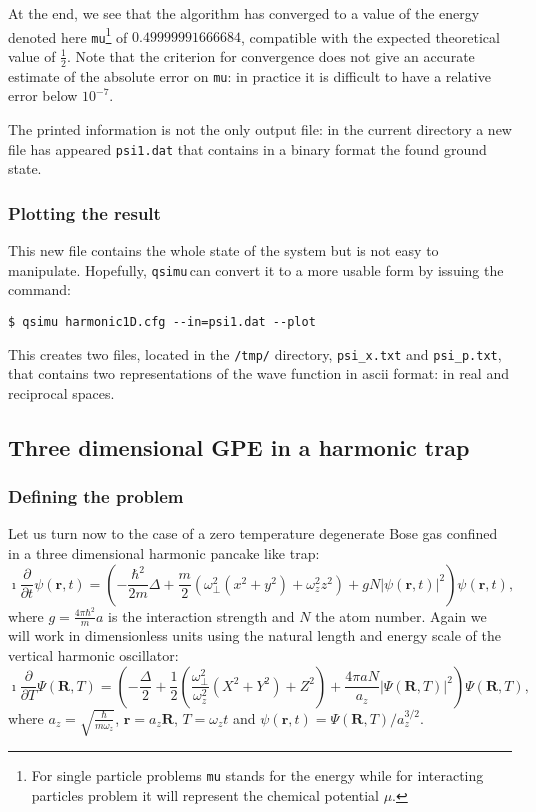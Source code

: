 \documentclass[12pt,a4paper]{report}
\newcommand{\abs}[1]{\left|#1\right|}
\newcommand{\qsimu}{\texttt{qsimu}\,}
\begin{document}
At the end, we see that the algorithm has converged to a value of the energy denoted here \texttt{mu}\footnote{For single particle problems \texttt{mu} stands for the energy while for interacting particles problem it will represent the chemical potential $\mu$.} of $0.49999991666684$, compatible with the expected theoretical value of $\frac{1}{2}$.
Note that the criterion for convergence does not give an accurate estimate of the absolute error on \texttt{mu}: in practice it is difficult to have a relative error below $10^{-7}$.

The printed information is not the only output file: in the current directory a new file has appeared \texttt{psi1.dat} that contains in a binary format the found ground state.

\subsubsection{Plotting the result}
This new file contains the whole state of the system but is not easy to manipulate.
Hopefully, \qsimu can convert it to a more usable form by issuing the command:
\begin{verbatim}
$ qsimu harmonic1D.cfg --in=psi1.dat --plot
\end{verbatim}
This creates two files, located in the \texttt{/tmp/} directory, \texttt{psi\_x.txt} and \texttt{psi\_p.txt}, that contains two representations of the wave function in ascii format: in real and reciprocal spaces.


\subsection{Three dimensional GPE in a harmonic trap}
\subsubsection{Defining the problem}
Let us turn now to the case of a zero temperature degenerate Bose gas confined in a three dimensional harmonic pancake like trap:
\begin{equation}
\imath\frac{\partial}{\partial t}\psi(\bm{r},t)=
\left(-\frac{\hbar^2}{2m}\Delta+\frac{m}{2}(\omega_\perp^2(x^2+y^2)+\omega_z^2z^2)
+gN\abs{\psi(\bm{r},t)}^2\right)\psi(\bm{r},t),
\end{equation}
where $g=\frac{4\pi\hbar^2}{m}a$ is the interaction strength and $N$ the atom number.
Again we will work in dimensionless units using the natural length and energy scale of the vertical harmonic oscillator:
\begin{equation}
\imath\frac{\partial}{\partial T}\Psi(\bm{R},T)=\left(-\frac{\Delta}{2}
+\frac{1}{2}\left(\frac{\omega_\perp^2}{\omega_z^2}(X^2+Y^2)+Z^2\right)
+\frac{4\pi aN}{a_z}\abs{\Psi(\bm{R},T)}^2\right)\Psi(\bm{R},T),
\label{eqn:3dlgpe}
\end{equation}
where $a_z=\sqrt{\frac{\hbar}{m\omega_z}}$, $\bm{r}=a_z\bm{R}$, $T=\omega_zt$ and $\psi(\bm{r},t)=\Psi(\bm{R},T)/a_z^{3/2}$.
\end{document}
